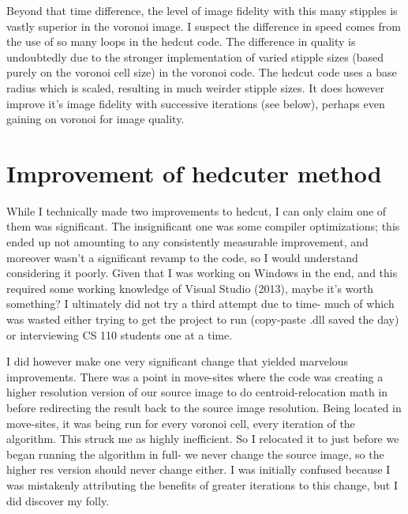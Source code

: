 \documentclass[11pt]{article}
\begin{document}
\begin{figure}[H]
\end{figure}

Beyond that time difference, the level of image fidelity with this many stipples is vastly superior in the voronoi image. I suspect the difference in speed comes from the use of so many loops in the hedcut code. The difference in quality is undoubtedly due to the stronger implementation of varied stipple sizes (based purely on the voronoi cell size) in the voronoi code. The hedcut code uses a base radius which is scaled, resulting in much weirder stipple sizes. It does however improve it's image fidelity with successive iterations (see below), perhaps even gaining on voronoi for image quality.

\section{Improvement of hedcuter method}
While I technically made two improvements to hedcut, I can only claim one of them was significant. The insignificant one was some compiler optimizations; this ended up not amounting to any consistently measurable improvement, and moreover wasn't a significant revamp to the code, so I would understand considering it poorly. Given that I was working on Windows in the end, and this required some working knowledge of Visual Studio (2013), maybe it's worth something? I ultimately did not try a third attempt due to time- much of which was wasted either trying to get the project to run (copy-paste .dll saved the day) or interviewing CS 110 students one at a time.

I did however make one very significant change that yielded marvelous improvements. There was a point in move-sites where the code was creating a higher resolution version of our source image to do centroid-relocation math in before redirecting the result back to the source image resolution. Being located in move-sites, it was being run for every voronoi cell, every iteration of the algorithm. This struck me as highly inefficient. So I relocated it to just before we began running the algorithm in full- we never change the source image, so the higher res version should never change either. I was initially confused because I was mistakenly attributing the benefits of greater iterations to this change, but I did discover my folly.
\end{document}
